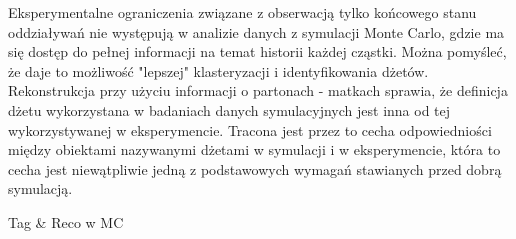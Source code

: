 Eksperymentalne ograniczenia związane z obserwacją tylko końcowego stanu oddziaływań nie występują w analizie danych z symulacji Monte Carlo, gdzie  ma się dostęp do pełnej informacji na temat historii każdej cząstki. Można pomyśleć, że daje to możliwość "lepszej" klasteryzacji i identyfikowania dżetów. 
Rekonstrukcja przy użyciu informacji o partonach - matkach sprawia, że definicja dżetu wykorzystana w badaniach danych symulacyjnych jest inna od tej wykorzystywanej w eksperymencie. Tracona jest przez to cecha odpowiedniości między obiektami nazywanymi dżetami w symulacji  i w eksperymencie, która to cecha jest niewątpliwie jedną z podstawowych wymagań stawianych przed dobrą symulacją.


Tag \& Reco w MC
